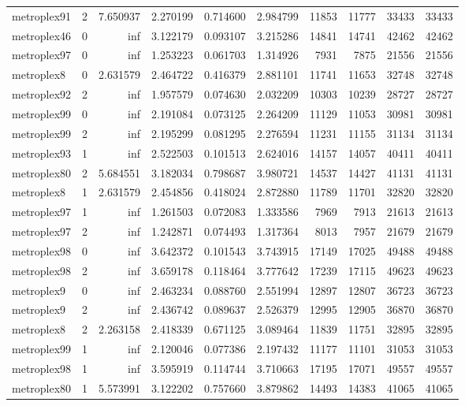\begin{longtable}{|l|r|r|r|r|r|r|r|r|r|}
metroplex91 & 2 & 7.650937 & 2.270199 & 0.714600 & 2.984799 & 11853 & 11777 & 33433 & 33433 \\
metroplex46 & 0 & inf & 3.122179 & 0.093107 & 3.215286 & 14841 & 14741 & 42462 & 42462 \\
metroplex97 & 0 & inf & 1.253223 & 0.061703 & 1.314926 & 7931 & 7875 & 21556 & 21556 \\
metroplex8 & 0 & 2.631579 & 2.464722 & 0.416379 & 2.881101 & 11741 & 11653 & 32748 & 32748 \\
metroplex92 & 2 & inf & 1.957579 & 0.074630 & 2.032209 & 10303 & 10239 & 28727 & 28727 \\
metroplex99 & 0 & inf & 2.191084 & 0.073125 & 2.264209 & 11129 & 11053 & 30981 & 30981 \\
metroplex99 & 2 & inf & 2.195299 & 0.081295 & 2.276594 & 11231 & 11155 & 31134 & 31134 \\
metroplex93 & 1 & inf & 2.522503 & 0.101513 & 2.624016 & 14157 & 14057 & 40411 & 40411 \\
metroplex80 & 2 & 5.684551 & 3.182034 & 0.798687 & 3.980721 & 14537 & 14427 & 41131 & 41131 \\
metroplex8 & 1 & 2.631579 & 2.454856 & 0.418024 & 2.872880 & 11789 & 11701 & 32820 & 32820 \\
metroplex97 & 1 & inf & 1.261503 & 0.072083 & 1.333586 & 7969 & 7913 & 21613 & 21613 \\
metroplex97 & 2 & inf & 1.242871 & 0.074493 & 1.317364 & 8013 & 7957 & 21679 & 21679 \\
metroplex98 & 0 & inf & 3.642372 & 0.101543 & 3.743915 & 17149 & 17025 & 49488 & 49488 \\
metroplex98 & 2 & inf & 3.659178 & 0.118464 & 3.777642 & 17239 & 17115 & 49623 & 49623 \\
metroplex9 & 0 & inf & 2.463234 & 0.088760 & 2.551994 & 12897 & 12807 & 36723 & 36723 \\
metroplex9 & 2 & inf & 2.436742 & 0.089637 & 2.526379 & 12995 & 12905 & 36870 & 36870 \\
metroplex8 & 2 & 2.263158 & 2.418339 & 0.671125 & 3.089464 & 11839 & 11751 & 32895 & 32895 \\
metroplex99 & 1 & inf & 2.120046 & 0.077386 & 2.197432 & 11177 & 11101 & 31053 & 31053 \\
metroplex98 & 1 & inf & 3.595919 & 0.114744 & 3.710663 & 17195 & 17071 & 49557 & 49557 \\
metroplex80 & 1 & 5.573991 & 3.122202 & 0.757660 & 3.879862 & 14493 & 14383 & 41065 & 41065 \\

\end{longtable}
